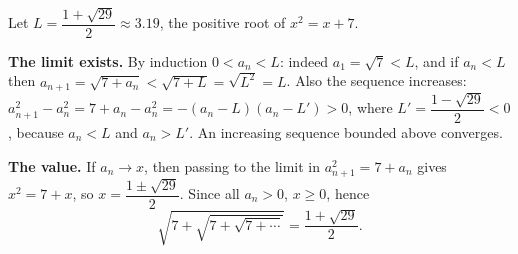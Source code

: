 Let $L=\dfrac{1+\sqrt{29}}{2}\approx3.19$, the positive root of $x^2=x+7$.

\textbf{The limit exists.} By induction $0<a_n<L$: indeed $a_1=\sqrt7<L$, and if $a_n<L$ then $a_{n+1}=\sqrt{7+a_n}<\sqrt{7+L}=\sqrt{L^2}=L$. Also the sequence increases: $a_{n+1}^2-a_n^2=7+a_n-a_n^2=-(a_n-L)(a_n-L')>0$, where $L'=\dfrac{1-\sqrt{29}}{2}<0$, because $a_n<L$ and $a_n>L'$. An increasing sequence bounded above converges.

\textbf{The value.} If $a_n\to x$, then passing to the limit in $a_{n+1}^2=7+a_n$ gives $x^2=7+x$, so $x=\dfrac{1\pm\sqrt{29}}{2}$. Since all $a_n>0$, $x\ge0$, hence
\[
\sqrt{7+\sqrt{7+\sqrt{7+\cdots}}}=\boxed{\dfrac{1+\sqrt{29}}{2}} .
\]
